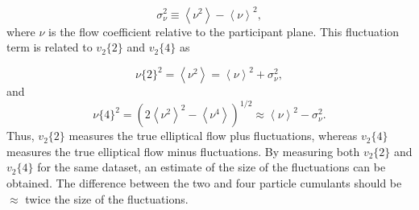 \begin{equation}
  \sigma_\nu^2 \equiv \left<\nu^2\right> - \left<\nu\right>^2,
\end{equation}
where $\nu$ is the flow coefficient relative to the participant plane. This fluctuation term is related to  $v_2\{2\}$ and $v_2\{4\}$ as 

\begin{equation}
\nu\{2\}^2 = \left<\nu^2\right> =  \left<\nu\right>^2 + \sigma_\nu^2,
\end{equation}
and
\begin{equation}
\nu\{4\}^2 = (2 \left<\nu^2\right>^2-\left<\nu^4\right>)^{1/2} \approx  \left<\nu\right>^2 -  \sigma_\nu^2.
\end{equation}
Thus, $v_2\{2\}$ measures the true elliptical flow plus fluctuations, whereas $v_2\{4\}$ measures the true elliptical flow minus fluctuations. By measuring both $v_2\{2\}$ and $v_2\{4\}$ for the same dataset, an estimate of the size of the fluctuations can be obtained. The difference between the two and four particle cumulants should be $\approx$ twice the size of the fluctuations.

